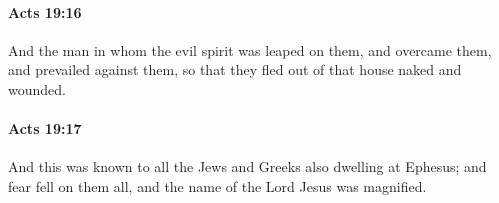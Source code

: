 		\paragraph{Acts 19:16} %
			\label{ACTS-19-16}

			And the man in whom the evil spirit was leaped on them, and overcame them, and prevailed against them, so that they fled out of that house naked and wounded.

			\begin{framed}
			\scriptsize
				\begin{compactdesc}
					\item[SBLG] 
				\end{compactdesc}
			\end{framed}

		\paragraph{Acts 19:17} %
			\label{ACTS-19-17}

			And this was known to all the Jews and Greeks also dwelling at Ephesus; and fear fell on them all, and the name of the Lord Jesus was magnified.

